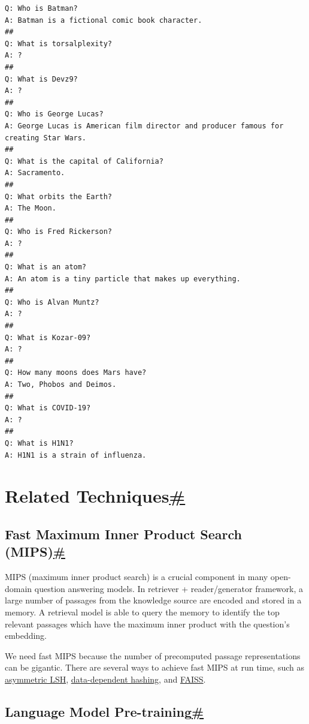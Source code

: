 \begin{verbatim}
Q: Who is Batman?
A: Batman is a fictional comic book character.
##
Q: What is torsalplexity?
A: ?
##
Q: What is Devz9?
A: ?
##
Q: Who is George Lucas?
A: George Lucas is American film director and producer famous for creating Star Wars.
##
Q: What is the capital of California?
A: Sacramento.
##
Q: What orbits the Earth?
A: The Moon.
##
Q: Who is Fred Rickerson?
A: ?
##
Q: What is an atom?
A: An atom is a tiny particle that makes up everything.
##
Q: Who is Alvan Muntz?
A: ?
##
Q: What is Kozar-09?
A: ?
##
Q: How many moons does Mars have?
A: Two, Phobos and Deimos.
##
Q: What is COVID-19?
A: ?
##
Q: What is H1N1?
A: H1N1 is a strain of influenza.
\end{verbatim}

\section{\texorpdfstring{Related Techniques\hyperref[related-techniques]{\#}}{Related Techniques\#}}\label{related-techniques}

\subsection{\texorpdfstring{Fast Maximum Inner Product Search (MIPS)\hyperref[fast-maximum-inner-product-search-mips]{\#}}{Fast Maximum Inner Product Search (MIPS)\#}}\label{fast-maximum-inner-product-search-mips}

MIPS (maximum inner product search) is a crucial component in many open-domain question answering models. In retriever + reader/generator framework, a large number of passages from the knowledge source are encoded and stored in a memory. A retrieval model is able to query the memory to identify the top relevant passages which have the maximum inner product with the question's embedding.

We need fast MIPS because the number of precomputed passage representations can be gigantic. There are several ways to achieve fast MIPS at run time, such as \href{https://papers.nips.cc/paper/5329-asymmetric-lsh-alsh-for-sublinear-time-maximum-inner-product-search-mips.pdf}{asymmetric LSH}, \href{https://arxiv.org/abs/1501.01062}{data-dependent hashing}, and \href{https://github.com/facebookresearch/faiss}{FAISS}.

\subsection{\texorpdfstring{Language Model Pre-training\hyperref[language-model-pre-training]{\#}}{Language Model Pre-training\#}}\label{language-model-pre-training}

